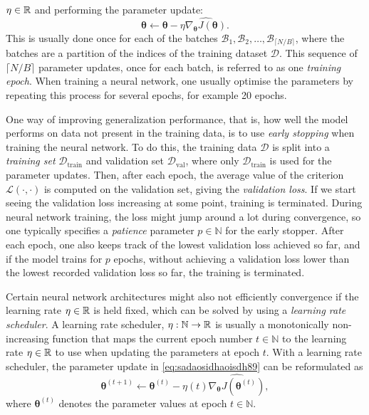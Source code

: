 \documentclass{statsmsc}
\begin{document}
{$\eta \in \mathbb{R}$ and performing the parameter update:
\begin{equation}\label{eq:sadaosidhaoisdh89}
    \bm\theta \leftarrow \bm\theta - \eta \widehat{\nabla_{\bm\theta} J(\bm\theta)}.
\end{equation}
This is usually done once for each of the batches
$\mathcal{B}_1,\mathcal{B}_2,\dots, \mathcal{B}_{\lceil N / B \rceil}$, where
the batches are a partition of the indices of the training dataset
$\mathcal{D}$. This sequence of $\lceil N / B \rceil$ parameter updates, once for each batch, is
referred to as one \textit{training epoch}.
When training a neural network, one usually optimise the parameters by repeating this process
for several epochs, for example 20 epochs.


One way of improving generalization performance, that is, how well the model performs on data
not present in the training data, is to use \textit{early stopping} when training the neural
network. To do this, the training data $\mathcal{D}$ is split into a \textit{training set}
$\mathcal{D}_{\textrm{train}}$ and validation set $\mathcal{D}_{\textrm{val}}$, where only
$\mathcal{D}_{\textrm{train}}$ is used for the parameter updates.
Then, after each epoch, the average value of the criterion $\mathcal{L}(\cdot,\cdot)$ is computed on
the validation set, giving the \textit{validation loss}. If we start seeing the validation loss
increasing at some point, training is terminated. During neural network training, the loss
might jump around a lot during convergence, so one typically specifies a
\textit{patience} parameter $p\in\mathbb{N}$
for the early stopper. After each epoch, one also keeps track of the lowest validation loss achieved
so far, and if the model trains for $p$ epochs, without achieving a validation
loss lower than the lowest recorded validation loss so far, the training is terminated.

Certain neural network architectures might also not efficiently convergence if the learning
rate $\eta \in \mathbb{R}$ is held fixed, which can be solved by using a \textit{learning rate scheduler}.
A learning rate scheduler, $\eta: \mathbb{N} \rightarrow {\mathbb{R}}$ is usually a
monotonically non-increasing function that maps the current epoch number $t \in \mathbb{N}$
to the learning rate $\eta \in \mathbb{R}$ to use when updating the parameters at epoch $t$. With
a learning rate scheduler, the parameter update in \cref{eq:sadaosidhaoisdh89} can be reformulated
as
\begin{equation}
    \bm\theta^{(t+1)} \leftarrow \bm\theta^{(t)} - \eta(t) \widehat{\nabla_{\bm\theta} J\left(\bm\theta^{(t)}\right)},
\end{equation}
where $\bm\theta^{(t)}$ denotes the parameter values at epoch $t \in \mathbb{N}$.

}
\end{document}

